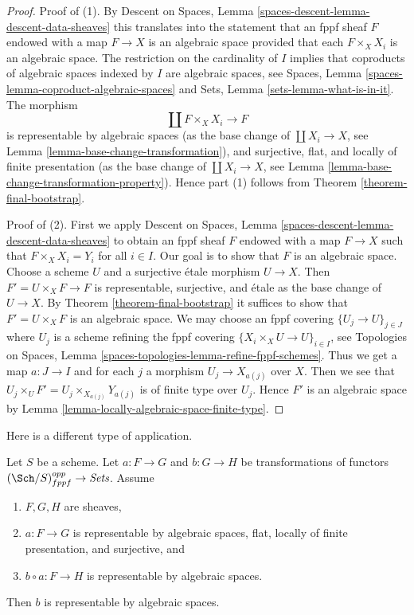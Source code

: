 \begin{proof}
Proof of (1). By
Descent on Spaces, Lemma \ref{spaces-descent-lemma-descent-data-sheaves}
this translates into the statement that an fppf sheaf $F$
endowed with a map $F \to X$ is an algebraic space provided that
each $F \times_X X_i$ is an algebraic space.
The restriction on the cardinality of $I$ implies that
coproducts of algebraic spaces indexed by $I$ are algebraic spaces, see
Spaces, Lemma \ref{spaces-lemma-coproduct-algebraic-spaces}
and
Sets, Lemma \ref{sets-lemma-what-is-in-it}.
The morphism
$$
\coprod F \times_X X_i \longrightarrow F
$$
is representable by algebraic spaces (as the base change of
$\coprod X_i \to X$, see Lemma \ref{lemma-base-change-transformation}),
and surjective, flat, and locally of finite presentation
(as the base change of $\coprod X_i \to X$, see
Lemma \ref{lemma-base-change-transformation-property}).
Hence part (1) follows from Theorem \ref{theorem-final-bootstrap}.

\medskip\noindent
Proof of (2). First we apply
Descent on Spaces, Lemma \ref{spaces-descent-lemma-descent-data-sheaves}
to obtain an fppf sheaf $F$ endowed with a map $F \to X$
such that $F \times_X X_i = Y_i$ for all $i \in I$.
Our goal is to show that $F$ is an algebraic space.
Choose a scheme $U$ and a surjective \'etale morphism $U \to X$.
Then $F' = U \times_X F \to F$ is representable, surjective, and \'etale
as the base change of $U \to X$.
By Theorem \ref{theorem-final-bootstrap} it suffices to show
that $F' = U \times_X F$ is an algebraic space.
We may choose an fppf covering $\{U_j \to U\}_{j \in J}$
where $U_j$ is a scheme refining the fppf covering
$\{X_i \times_X U \to U\}_{i \in I}$, see
Topologies on Spaces, Lemma
\ref{spaces-topologies-lemma-refine-fppf-schemes}.
Thus we get a map $a : J \to I$ and for each $j$
a morphism $U_j \to X_{a(j)}$ over $X$.
Then we see that $U_j \times_U F' = U_j \times_{X_{a(j)}} Y_{a(j)}$
is of finite type over $U_j$. Hence $F'$ is an algebraic
space by Lemma \ref{lemma-locally-algebraic-space-finite-type}.
\end{proof}

\noindent
Here is a different type of application.

\begin{lemma}
\label{lemma-representable-by-spaces-cover}
Let $S$ be a scheme. Let $a : F \to G$ and $b : G \to H$ be
transformations of functors $(\Sch/S)_{fppf}^{opp} \to \textit{Sets}$.
Assume
\begin{enumerate}
\item $F, G, H$ are sheaves,
\item $a : F \to G$ is representable by algebraic spaces, flat,
locally of finite presentation, and surjective, and
\item $b \circ a : F \to H$ is representable by algebraic spaces.
\end{enumerate}
Then $b$ is representable by algebraic spaces.
\end{lemma}

